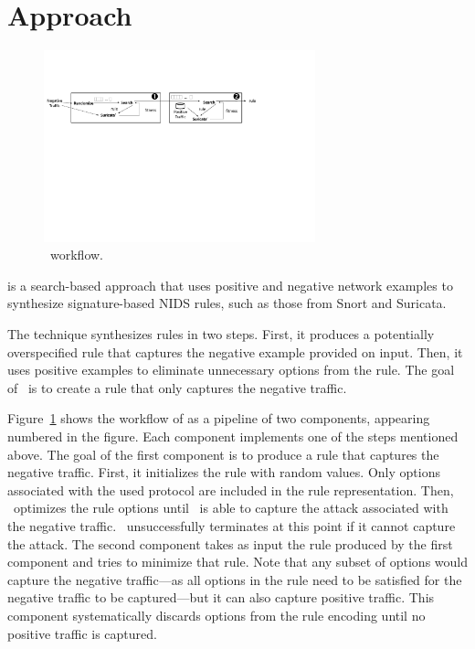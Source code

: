 \documentclass[conference]{IEEEtran}
\begin{document}
\section{Approach}

\begin{figure}[t]
\centering
\includegraphics[trim=10 360 182 130,clip,width=0.7\textwidth]{figs/nids-workflow}
\caption{\tname\ workflow.}
\label{fig:overview}
\end{figure}

\tname{} is a search-based approach that uses positive and negative
network examples to synthesize signature-based NIDS rules, such as
those from Snort and Suricata.

The technique synthesizes rules in two steps. First, it produces a
potentially overspecified rule that captures the negative example
provided on input. Then, it uses positive examples to eliminate
unnecessary options from the rule. The goal of \tname\ is to create a
rule that only captures the negative traffic.

Figure~\ref{fig:overview} shows the workflow of \tname{} as a pipeline
of two components, appearing numbered in the figure. Each component
implements one of the steps mentioned above. The goal of the first
component is to produce a rule that captures the negative traffic.
First, it initializes the rule with random values. Only options
associated with the used protocol are included in the rule
representation. Then, \tname\ optimizes the rule options until
\suri\ is able to capture the attack associated with the negative
traffic.  \tname\ unsuccessfully terminates at this point if it cannot
capture the attack. The second component takes as input the rule
produced by the first component and tries to minimize that rule. Note
that any subset of options would capture the negative traffic---as all
options in the rule need to be satisfied for the negative traffic to
be captured---but it can also capture positive traffic. This component
systematically discards options from the rule encoding until no
positive traffic is captured.
\end{document}
